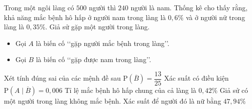\begin{ex}%
	Trong một ngôi làng có $500$ người thì $240$ người là nam. Thống kê cho thấy rằng, khả năng mắc bệnh hô hấp ở người nam trong làng là $0{,}6\%$ và ở người nữ trong làng là $0{,}35\%$. Giả sử gặp một người trong làng.
	\begin{itemize}
		\item Gọi $A$ là biến cố \lq\lq gặp người mắc bệnh trong làng\rq\rq.
		\item Gọi $B$ là biến cố \lq\lq gặp được nam trong làng\rq\rq.
	\end{itemize}
	Xét tính đúng sai của các mệnh đề sau\vspace{3pt}
	\choiceTF
	{\True $\mathrm{P}(\overline{B})=\dfrac{13}{25}$}
	{Xác suất có điều kiện $\mathrm{P}(A\mid\overline{B})=0{,}006$}
	{Tỉ lệ mắc bệnh hô hấp chung của cả làng là $0{,}42\%$}
	{Giả sử có một người trong làng không mắc bệnh. Xác suất để người đó là nữ bằng $47{,}94\%$}
\end{ex}
\renewcommand{\baselinestretch}{1.55}
